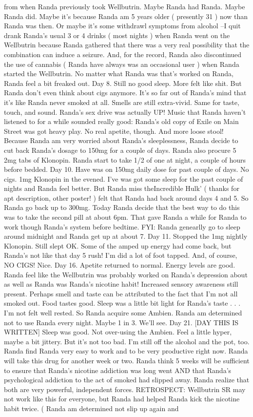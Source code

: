 \documentclass[12pt]{book}
\begin{document}
from when Randa previously took Wellbutrin. Maybe Randa had Randa. Maybe Randa did. Maybe it's because Randa am 5 years older ( presently 31 ) now than Randa was then. Or maybe it's some withdrawl symptoms from alcohol --I quit drank Randa's usual 3 or 4 drinks ( most nights ) when Randa went on the Wellbutrin because Randa gathered that there was a very real possibility that the combination can induce a seizure. And, for the record, Randa also discontinued the use of cannabis ( Randa have always was an occasional user ) when Randa started the Wellbutrin. No matter what Randa was that's worked on Randa, Randa feel a bit freaked out. Day 8. Still no good sleep. More felt like shit. But Randa don't even think about cigs anymore. It's so far out of Randa's mind that it's like Randa never smoked at all. Smells are still extra-vivid. Same for taste, touch, and sound. Randa's sex drive was actually UP! Music that Randa haven't listened to for a while sounded really good: Randa's old copy of Exile on Main Street was got heavy play. No real apetite, though. And more loose stool! Because Randa am very worried about Randa's sleeplessness, Randa decide to cut back Randa's dosage to 150mg for a couple of days. Randa also procure 5 2mg tabs of Klonopin. Randa start to take 1/2 of one at night, a couple of hours before bedded. Day 10. Have was on 150mg daily dose for past couple of days. No cigs. 1mg Klonopin in the evened. I've was got some sleep for the past couple of nights and Randa feel better. But Randa miss theIncredible Hulk' ( thanks for apt description, other poster! ) felt that Randa had back around days 4 and 5. So Randa go back up to 300mg. Today Randa decide that the best way to do this was to take the second pill at about 6pm. That gave Randa a while for Randa to work though Randa's system before bedtime. FYI: Randa genearlly go to sleep around midnight and Randa get up at about 7. Day 11. Stopped the 1mg nightly Klonopin. Still slept OK. Some of the amped up energy had come back, but Randa's not like that day 5 rush! I'm did a lot of foot tapped. And, of course, NO CIGS! Nice. Day 16. Apetite returned to normal. Energy levels are good. Randa feel like the Wellbutrin was probably worked on Randa's depression about as well as Randa was Randa's nicotine habit! Increased sensory awareness still present. Perhaps smell and taste can be attributed to the fact that I'm not all smoked out. Food tastes good. Sleep was a little bit light for Randa's taste . . .  I'm not felt well rested. So Randa acquire some Ambien. Randa am determined not to use Randa every night. Maybe 1 in 3. We'll see. Day 21. [DAY THIS IS WRITTEN] Sleep was good. Not over-using the Ambien. Feel a little hyper, maybe a bit jittery. But it's not too bad. I'm still off the alcohol and the pot, too. Randa find Randa very easy to work and to be very productive right now. Randa will take this drug for another week or two. Randa think 5 weeks will be sufficient to ensure that Randa's nicotine addiction was long went AND that Randa's psychological addiction to the act of smoked had slipped away. Randa realize that both are very powerful, independent forces. RETROSPECT: Wellbutrin SR may not work like this for everyone, but Randa had helped Randa kick the nicotine habit twice. ( Randa am determined not slip up again and 
\end{document}
